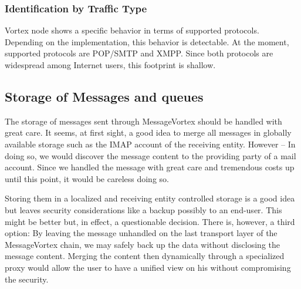 \subsubsection{Identification by Traffic Type}
Vortex node shows a specific behavior in terms of supported protocols. Depending on the implementation, this behavior is detectable. At the moment, supported protocols are POP/SMTP and XMPP. Since both protocols are widespread among Internet users, this footprint is shallow.

\subsection{Storage of Messages and queues}
The storage of messages sent through MessageVortex should be handled with great care. It seems, at first sight, a good idea to merge all messages in globally available storage such as the IMAP account of the receiving entity. However -- In doing so, we would discover the message content to the providing party of a mail account. Since we handled the message with great care and tremendous costs up until this point, it would be careless doing so. 

Storing them in a localized and receiving entity controlled storage is a good idea but leaves security considerations like a backup possibly to an end-user. This might be better but, in effect, a questionable decision. There is, however, a third option: By leaving the message unhandled on the last transport layer of the MessageVortex chain, we may safely back up the data without disclosing the message content. Merging the content then dynamically through a specialized proxy would allow the user to have a unified view on his without compromising the security.

